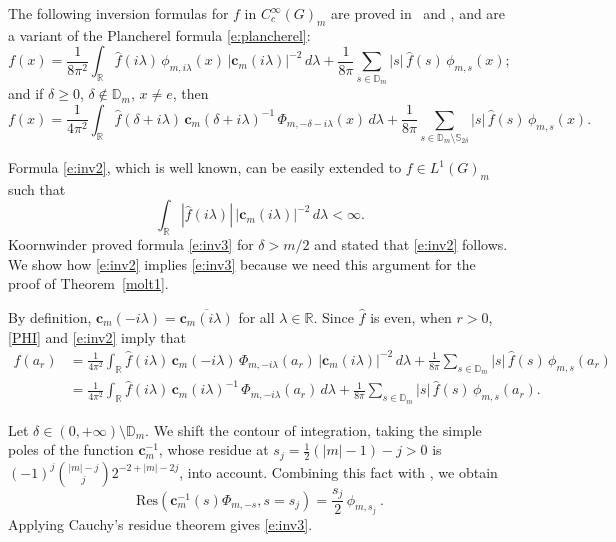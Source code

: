 \documentclass[12pt,a4paper]{amsart}
\theoremstyle{definition}
\theoremstyle{remark}
\numberwithin{equation}{section}
\newcommand{\R}{\mathbb{R}}
\newcommand{\Strip}{\mathbb{S}}
\newcommand{\Discr}{\mathbb{D}_m}
\newcommand{\bfc}{\mathbf{c}_m}
\newcommand{\var}{s}
\begin{document}
The following inversion formulas for $f$  in $C^\infty_c(G)_m$ are proved in~\cite{T} and \cite{Koo},
and are a variant of the Plancherel formula \eqref{e:plancherel}:
\color{black}
\begin{equation}\label{e:inv2}
f(x)
=\frac{1}{8\pi^2}\int_\R \hat{f}(i\lambda)\,\phi_{m,i\lambda}(x)\,|\bfc(i\lambda)|^{-2}
\, d\lambda
+\frac{1}{8\pi}\sum_{\var\in \Discr}|\var|\, \hat{f}(\var)\, \phi_{m,\var}(x);
\end{equation}
and if   $\delta\geq 0$, $\delta\notin \Discr$, $x\neq e$, then
\begin{equation}\label{e:inv3}
f(x)=\frac{1}{4\pi^2}\int_\R \hat{f}(\delta+i\lambda)\,
\mathbf{c}_m(\delta+i\lambda)^{-1}\, \Phi_{m,-\delta-i\lambda}(x) \, d\lambda 
+\frac{1}{8\pi}\sum_{\var\in \Discr\setminus \Strip_{2\delta}}|\var|\, \hat{f}(\var)\, \phi_{m,\var}(x).
\end{equation}

Formula  \eqref{e:inv2}, which is well known, can be easily extended to $f\in L^1(G)_m$ such that 
\[
\int_\R |\hat f (i\lambda)|\,|\bfc(i\lambda)|^{-2}\,d\lambda<\infty .
\]
 Koornwinder proved formula \eqref{e:inv3}  for $\delta>m/2$  and stated that \eqref{e:inv2} follows.
 We show how \eqref{e:inv2} implies \eqref{e:inv3} because  we need this argument for the  proof of Theorem~\ref{molt1}.
 
By definition, $\mathbf{c}_m(-i\lambda)=\overline{\mathbf{c}_m(i\lambda)}$ 
 for all $\lambda\in \R$. 
Since $\hat f$ is even, when $r>0$, \eqref{PHI} and \eqref{e:inv2} imply that
\begin{align*}
f(a_r)
&=\frac{1}{4\pi^2}\int_\R\hat f(i\lambda)\,\mathbf{c}_m(-i\lambda)\,\Phi_{m,-i\lambda}(a_r)
\,|\mathbf{c}_m(i\lambda)|^{-2}
\, d\lambda 
+\frac{1}{8\pi}\sum_{\var\in \Discr}|\var|\, \hat f(\var)\, \phi_{m,\var}(a_r)
\\
&
=\frac{1}{4\pi^2}\int_\R\hat f(i\lambda)\,
\mathbf{c}_m(i\lambda)^{-1}\, \Phi_{m,-i\lambda}(a_r) \, d\lambda 
+\frac{1}{8\pi}\sum_{\var\in \Discr}|\var|\, \hat f(\var)\, \phi_{m,\var}(a_r).
\end{align*}
 
 
 
 
 Let  $\delta\in (0, +\infty)\setminus\Discr$. 
We shift the contour of integration, taking the simple poles of the function  $\bfc^{-1}$, whose residue at $\var_j=\frac{1}{2}( |m|-1 )-j>0$ is $(-1)^j\binom{|m|-j}{j} 2^{-2+|m|-2j}$, into account. 
Combining this fact  with   \cite[10.8 (16)]{ErdII},  we obtain
\[
\mathrm{Res}(\bfc^{-1}(\var)\Phi_{m,-\var},\var=\var_j)=\frac{\var_j}{2}\,\phi_{m,\var_j}\ .
\]
Applying Cauchy's residue theorem gives \eqref{e:inv3}.
\end{document}
